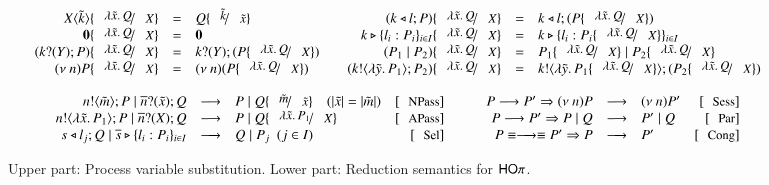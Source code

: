 \begin{figure}[t!]
\[
	\begin{array}{c}
		\begin{array}{rclcrcl}
			\appl{X}{\tilde{k}} \subst{\abs{\tilde{x}}{Q}}{\X} & = & Q \subst{\tilde{k}}{\tilde{x}}
			& &
			(\bsel{k}{l} P)\subst{\abs{\tilde{x}}{Q}}{\X} & = & \bsel{k}{l} (P \subst{\abs{\tilde{x}}{Q}}{\X})
			\\

			\inact \subst{\abs{\tilde{x}}{Q}}{\X} & = & \inact
			& &
			\bbra{k}{l_i : P_i}_{i \in I} \subst{\abs{\tilde{x}}{Q}}{\X} & = & \bbra{k}{l_i : P_i \subst{\abs{\tilde{x}}{Q}}{\X}}_{i \in I} 
			\\

			(\binp{k}{Y} P) \subst{\abs{\tilde{x}}{Q}}{X} & = & \binp{k}{Y} (P \subst{\abs{\tilde{x}}{Q}}{X})
			& &
			(P_1 \Par P_2) \subst{\abs{\tilde{x}}{Q}}{X} & = & P_1 \subst{\abs{\tilde{x}}{Q}}{X} \Par P_2 \subst{\abs{\tilde{x}}{Q}}{X}
			\\

			\news{n} P \subst{\abs{\tilde{x}}{Q}}{\X} & = & \news{n} (P \subst{\abs{\tilde{x}}{Q}}{X})
			& &
			(\bout{k}{\abs{\tilde{y}}{P_1}} P_2) \subst{\abs{\tilde{x}}{Q}}{X} & = & \bout{k}{\abs{\tilde{y}}{P_1 \subst{\abs{\tilde{x}}{Q}}{X}}} (P_2 \subst{\abs{\tilde{x}}{Q}}{X})
		\end{array}

		\vspace{4mm}\\

		\begin{array}{rclrcrclr}
			\bout{n}{\tilde{m}} P \Par \binp{\dual{n}}{\tilde{x}} Q & \red & P \Par Q \subst{\tilde{m}}{\tilde{x}} \quad(|\tilde{x}| = |\tilde{m}|)& \orule{NPass}
			& \quad &
			P \red P' \Rightarrow \news{n} P & \red & \news{n} P'  & \orule{Sess}
			\\

			\bout{n}{\abs{\tilde{x}}{P_1}} P \Par \binp{\dual{n}}{\X} Q & \red & P \Par Q \subst{\abs{\tilde{x}}{P_1}}{\X}\ & \orule{APass}
			& &
			P \red P' \Rightarrow   P \Par Q & \red &  P' \Par Q  & \orule{Par}
			\\

			\bsel{s}{l_j} Q \Par \bbra{\dual{s}}{l_i : P_i}_{i \in I} & \red & Q \Par P_j ~~(j \in I)~~  & \orule{Sel}
			& &
			P \scong \red \scong P' \Rightarrow P & \red & P' & \orule{Cong}\\
		\end{array}
	\end{array}
\]
	\caption{Upper part: Process variable substitution. Lower part: Reduction semantics for $\mathsf{HO}\pi$. \label{fig:reduction}}
\end{figure}
